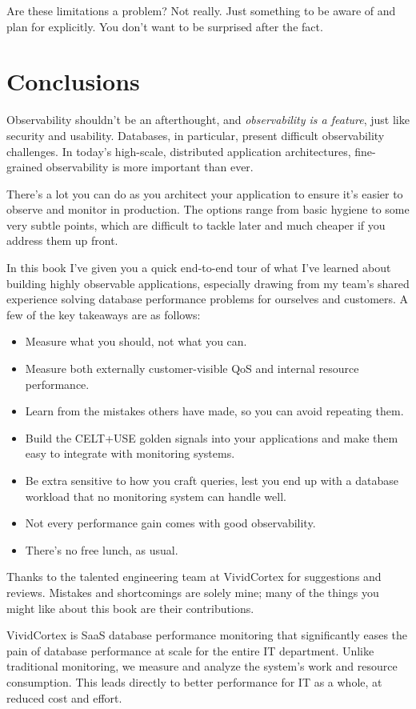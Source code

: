 \documentclass{vivid_layout}
\begin{document}
Are these limitations a problem? Not really. Just something to be aware of and
plan for explicitly. You don't want to be surprised after the fact.

\section{Conclusions}

Observability shouldn't be an afterthought, and \emph{observability is a feature},
just like security and usability. Databases, in particular, present
difficult observability challenges. In today's high-scale, distributed
application architectures, fine-grained observability is more important than ever.

There's a lot you can do as you architect your application to ensure it's 
easier to observe and monitor in production. The options range from basic hygiene to some very
subtle points, which are difficult to tackle later and much cheaper if you
address them up front.

In this book I've given you a quick end-to-end tour of what I've learned about
building highly observable applications, especially drawing from my team's
shared experience solving database performance problems for ourselves and
customers.  A few of the key takeaways are as follows:

\begin{itemize}
\item Measure what you should, not what you can.
\item Measure both externally customer-visible QoS and internal resource performance.
\item Learn from the mistakes others have made, so you can avoid repeating them.
\item Build the CELT+USE golden signals into your applications and make them easy to integrate with
monitoring systems.
\item Be extra sensitive to how you craft queries, lest you end up with a
database workload that no monitoring system can handle well.
\item Not every performance gain comes with good observability.
\item There's no free lunch, as usual.
\end{itemize}

Thanks to the talented engineering team at VividCortex for suggestions and
reviews. Mistakes and shortcomings are solely mine; many of the things you might
like about this book are their contributions.

\newpage

\begin{about}	%
VividCortex is SaaS database performance monitoring that significantly eases the pain of database performance at scale for the entire IT department. Unlike traditional monitoring, we measure
and analyze the system's work and resource consumption. This leads directly to better performance for IT as a whole, at reduced cost and effort.
\end{about}
\makeresources	%
\end{document}
